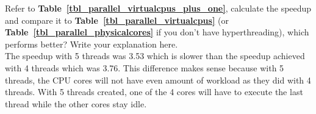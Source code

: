 \documentclass[12pt]{article}
\begin{document}
Refer to {\bf Table~\ref{tbl_parallel_virtualcpus_plus_one}}, calculate the
speedup and compare it to {\bf Table~\ref{tbl_parallel_virtualcpus}} (or
{\bf Table~\ref{tbl_parallel_physicalcores}} if you don't have hyperthreading),
which performs better? Write your explanation here.
\\
\indent
The speedup with 5 threads was 3.53 which is slower than the speedup achieved with 4 threads which was 3.76. This difference makes sense because with 5 threads, the CPU cores will not have even amount
of workload as they did with 4 threads. With 5 threads created, one of the 4 cores will have to execute the last thread while the other cores stay idle.
\end{document}
